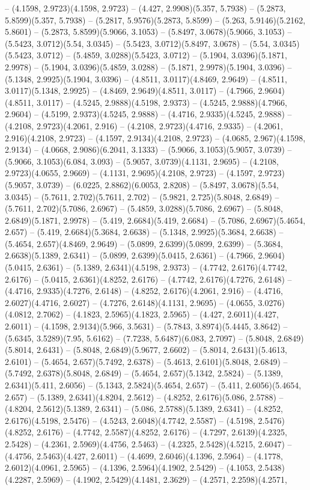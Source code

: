 -- (4.1598, 2.9723)(4.1598, 2.9723) -- (4.427, 2.9908)(5.357, 5.7938) -- (5.2873, 5.8599)(5.357, 5.7938) -- (5.2817, 5.9576)(5.2873, 5.8599) -- (5.263, 5.9146)(5.2162, 5.8601) -- (5.2873, 5.8599)(5.9066, 3.1053) -- (5.8497, 3.0678)(5.9066, 3.1053) -- (5.5423, 3.0712)(5.54, 3.0345) -- (5.5423, 3.0712)(5.8497, 3.0678) -- (5.54, 3.0345)(5.5423, 3.0712) -- (5.4859, 3.0288)(5.5423, 3.0712) -- (5.1904, 3.0396)(5.1871, 2.9978) -- (5.1904, 3.0396)(5.4859, 3.0288) -- (5.1871, 2.9978)(5.1904, 3.0396) -- (5.1348, 2.9925)(5.1904, 3.0396) -- (4.8511, 3.0117)(4.8469, 2.9649) -- (4.8511, 3.0117)(5.1348, 2.9925) -- (4.8469, 2.9649)(4.8511, 3.0117) -- (4.7966, 2.9604)(4.8511, 3.0117) -- (4.5245, 2.9888)(4.5198, 2.9373) -- (4.5245, 2.9888)(4.7966, 2.9604) -- (4.5199, 2.9373)(4.5245, 2.9888) -- (4.4716, 2.9335)(4.5245, 2.9888) -- (4.2108, 2.9723)(4.2061, 2.916) -- (4.2108, 2.9723)(4.4716, 2.9335) -- (4.2061, 2.916)(4.2108, 2.9723) -- (4.1597, 2.9134)(4.2108, 2.9723) -- (4.0685, 2.967)(4.1598, 2.9134) -- (4.0668, 2.9086)(6.2041, 3.1333) -- (5.9066, 3.1053)(5.9057, 3.0739) -- (5.9066, 3.1053)(6.084, 3.093) -- (5.9057, 3.0739)(4.1131, 2.9695) -- (4.2108, 2.9723)(4.0655, 2.9669) -- (4.1131, 2.9695)(4.2108, 2.9723) -- (4.1597, 2.9723)(5.9057, 3.0739) -- (6.0225, 2.8862)(6.0053, 2.8208) -- (5.8497, 3.0678)(5.54, 3.0345) -- (5.7611, 2.702)(5.7611, 2.702) -- (5.9821, 2.725)(5.8048, 2.6849) -- (5.7611, 2.702)(5.7086, 2.6967) -- (5.4859, 3.0288)(5.7086, 2.6967) -- (5.8048, 2.6849)(5.1871, 2.9978) -- (5.419, 2.6684)(5.419, 2.6684) -- (5.7086, 2.6967)(5.4654, 2.657) -- (5.419, 2.6684)(5.3684, 2.6638) -- (5.1348, 2.9925)(5.3684, 2.6638) -- (5.4654, 2.657)(4.8469, 2.9649) -- (5.0899, 2.6399)(5.0899, 2.6399) -- (5.3684, 2.6638)(5.1389, 2.6341) -- (5.0899, 2.6399)(5.0415, 2.6361) -- (4.7966, 2.9604)(5.0415, 2.6361) -- (5.1389, 2.6341)(4.5198, 2.9373) -- (4.7742, 2.6176)(4.7742, 2.6176) -- (5.0415, 2.6361)(4.8252, 2.6176) -- (4.7742, 2.6176)(4.7276, 2.6148) -- (4.4716, 2.9335)(4.7276, 2.6148) -- (4.8252, 2.6176)(4.2061, 2.916) -- (4.4716, 2.6027)(4.4716, 2.6027) -- (4.7276, 2.6148)(4.1131, 2.9695) -- (4.0655, 3.0276)(4.0812, 2.7062) -- (4.1823, 2.5965)(4.1823, 2.5965) -- (4.427, 2.6011)(4.427, 2.6011) -- (4.1598, 2.9134)(5.966, 3.5631) -- (5.7843, 3.8974)(5.4445, 3.8642) -- (5.6345, 3.5289)(7.95, 5.6162) -- (7.7238, 5.6487)(6.083, 2.7097) -- (5.8048, 2.6849)(5.8014, 2.6431) -- (5.8048, 2.6849)(5.9677, 2.6602) -- (5.8014, 2.6431)(5.4613, 2.6101) -- (5.4654, 2.657)(5.7492, 2.6378) -- (5.4613, 2.6101)(5.8048, 2.6849) -- (5.7492, 2.6378)(5.8048, 2.6849) -- (5.4654, 2.657)(5.1342, 2.5824) -- (5.1389, 2.6341)(5.411, 2.6056) -- (5.1343, 2.5824)(5.4654, 2.657) -- (5.411, 2.6056)(5.4654, 2.657) -- (5.1389, 2.6341)(4.8204, 2.5612) -- (4.8252, 2.6176)(5.086, 2.5788) -- (4.8204, 2.5612)(5.1389, 2.6341) -- (5.086, 2.5788)(5.1389, 2.6341) -- (4.8252, 2.6176)(4.5198, 2.5476) -- (4.5243, 2.6048)(4.7742, 2.5587) -- (4.5198, 2.5476)(4.8252, 2.6176) -- (4.7742, 2.5587)(4.8252, 2.6176) -- (4.7297, 2.6139)(4.2325, 2.5428) -- (4.2361, 2.5969)(4.4756, 2.5463) -- (4.2325, 2.5428)(4.5215, 2.6047) -- (4.4756, 2.5463)(4.427, 2.6011) -- (4.4699, 2.6046)(4.1396, 2.5964) -- (4.1778, 2.6012)(4.0961, 2.5965) -- (4.1396, 2.5964)(4.1902, 2.5429) -- (4.1053, 2.5438)(4.2287, 2.5969) -- (4.1902, 2.5429)(4.1481, 2.3629) -- (4.2571, 2.2598)(4.2571, 